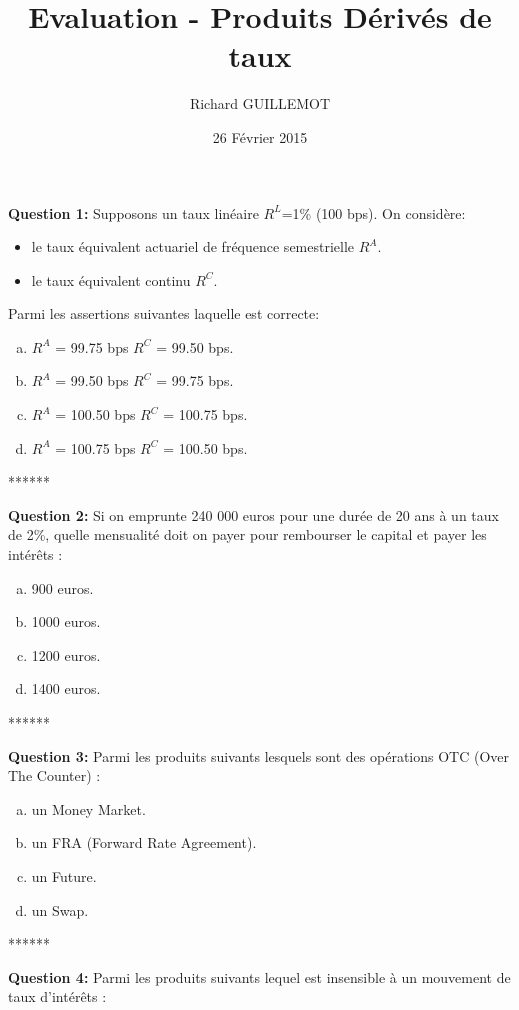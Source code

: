 \documentclass{article}
\newcommand{\indentitem}{\setlength\itemindent{25pt}}
\begin{document}
\title{Evaluation - Produits Dérivés de taux}
\date{26 Février 2015}
\author{Richard GUILLEMOT}
\maketitle

\textbf{Question 1:} Supposons un taux linéaire $R^L$=1\% (100 bps). On considère: 
\begin{itemize}
	\indentitem \item le taux équivalent actuariel de fréquence semestrielle $R^A$.
	\indentitem \item le taux équivalent continu $R^C$.
\end{itemize}
\vspace{0.2cm}
Parmi les assertions suivantes laquelle est correcte:
\begin{enumerate}[a)]
\indentitem \item $R^A$ = 99.75 bps $R^C$ = 99.50 bps.
\indentitem \item $R^A$ = 99.50 bps $R^C$ = 99.75 bps.
\indentitem \item $R^A$ = 100.50 bps $R^C$ = 100.75 bps.
\indentitem \item $R^A$ = 100.75 bps $R^C$ = 100.50 bps.
\end{enumerate}
\smallskip
\centerline{******}
\smallskip
\textbf{Question 2:}
Si on emprunte 240 000 euros pour une durée de 20 ans à un taux de 2\%, quelle mensualité doit on payer pour rembourser le capital et payer les intérêts :
\begin{enumerate}[a)]
\indentitem \item 900 euros.
\indentitem \item 1000 euros.
\indentitem \item 1200 euros.
\indentitem \item 1400 euros.
\end{enumerate}
\smallskip
\centerline{******}
\smallskip
\textbf{Question 3:}
Parmi les produits suivants lesquels sont des opérations OTC (Over The Counter) :
\begin{enumerate}[a)]
\indentitem \item un Money Market.
\indentitem \item un FRA (Forward Rate Agreement).
\indentitem \item un Future.
\indentitem \item un Swap.
\end{enumerate}
\newpage
\smallskip
\centerline{******}
\smallskip
\textbf{Question 4:}
Parmi les produits suivants lequel est insensible à un mouvement de taux d’intérêts :
\end{document}
